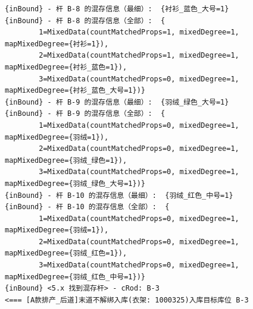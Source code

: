 {\begin{verbatim}
{inBound} - 杆 B-8 的混存信息（最细）:  {衬衫_蓝色_大号=1}
{inBound} - 杆 B-8 的混存信息（全部）:  {
		1=MixedData(countMatchedProps=1, mixedDegree=1, mapMixedDegree={衬衫=1}), 
		2=MixedData(countMatchedProps=1, mixedDegree=1, mapMixedDegree={衬衫_蓝色=1}), 
		3=MixedData(countMatchedProps=0, mixedDegree=1, mapMixedDegree={衬衫_蓝色_大号=1})}
{inBound} - 杆 B-9 的混存信息（最细）:  {羽绒_绿色_大号=1}
{inBound} - 杆 B-9 的混存信息（全部）:  {
		1=MixedData(countMatchedProps=0, mixedDegree=1, mapMixedDegree={羽绒=1}), 
		2=MixedData(countMatchedProps=0, mixedDegree=1, mapMixedDegree={羽绒_绿色=1}), 
		3=MixedData(countMatchedProps=0, mixedDegree=1, mapMixedDegree={羽绒_绿色_大号=1})}
{inBound} - 杆 B-10 的混存信息（最细）:  {羽绒_红色_中号=1}
{inBound} - 杆 B-10 的混存信息（全部）:  {
		1=MixedData(countMatchedProps=0, mixedDegree=1, mapMixedDegree={羽绒=1}), 
		2=MixedData(countMatchedProps=0, mixedDegree=1, mapMixedDegree={羽绒_红色=1}), 
		3=MixedData(countMatchedProps=0, mixedDegree=1, mapMixedDegree={羽绒_红色_中号=1})}
{inBound} <5.x 找到混存杆> - cRod: B-3
<=== [A款排产_后道]末道不解绑入库(衣架: 1000325)入库目标库位 B-3


\end{verbatim}}
